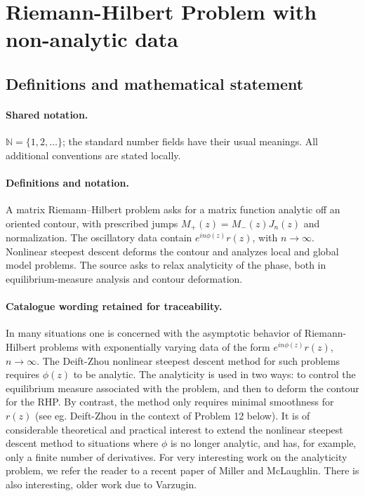 \documentclass[11pt]{article}
\begin{document}
\section{Riemann-Hilbert Problem with non-analytic data}\label{statement}

\subsection{Definitions and mathematical statement}

\paragraph{Shared notation.}$\mathbb N=\{1,2,\ldots\}$; the standard number fields have their usual meanings. All additional conventions are stated locally.


\paragraph{Definitions and notation.}A matrix Riemann--Hilbert problem asks for a matrix function analytic off an oriented contour, with prescribed jumps $M_+(z)=M_-(z)J_n(z)$ and normalization. The oscillatory data contain $e^{in\phi(z)}r(z)$, with $n\to\infty$. Nonlinear steepest descent deforms the contour and analyzes local and global model problems. The source asks to relax analyticity of the phase, both in equilibrium-measure analysis and contour deformation.

\paragraph{Catalogue wording retained for traceability.}
In many situations one is concerned with the asymptotic behavior of Riemann-Hilbert problems with exponentially varying data of the form $e^{in\phi(z)} r(z)$, $n \to \infty$. The Deift-Zhou nonlinear steepest descent method for such problems requires $\phi(z)$ to be analytic. The analyticity is used in two ways: to control the equilibrium measure associated with the problem, and then to deform the contour for the RHP. By contrast, the method only requires minimal smoothness for $r(z)$ (see eg. Deift-Zhou in the context of Problem 12 below). It is of considerable theoretical and practical interest to extend the nonlinear steepest descent method to situations where $\phi$ is no longer analytic, and has, for example, only a finite number of derivatives. For very interesting work on the analyticity problem, we refer the reader to a recent paper of Miller and McLaughlin. There is also interesting, older work due to Varzugin.
\end{document}
